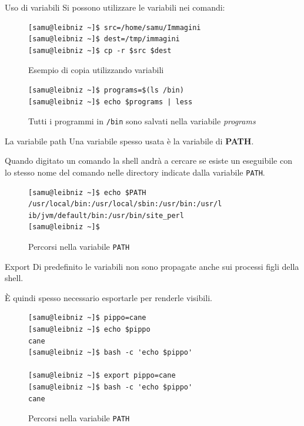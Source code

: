\documentclass{beamer}
\begin{document}
\begin{frame}[fragile]{Uso di variabili}
  Si possono utilizzare le variabili nei comandi:

  \begin{figure}
    \begin{lstlisting}
[samu@leibniz ~]$ src=/home/samu/Immagini
[samu@leibniz ~]$ dest=/tmp/immagini
[samu@leibniz ~]$ cp -r $src $dest
    \end{lstlisting}
    \caption{Esempio di copia utilizzando variabili}
  \end{figure}

  \begin{figure}
    \begin{lstlisting}
[samu@leibniz ~]$ programs=$(ls /bin)
[samu@leibniz ~]$ echo $programs | less
    \end{lstlisting}
    \caption{Tutti i programmi in \texttt{/bin} sono salvati nella variabile 
    \textit{programs}}
  \end{figure}
\end{frame}

\begin{frame}[fragile]{La variabile path}
  Una variabile spesso usata è la variabile di \textbf{PATH}. \medskip

  Quando digitato un comando la shell andrà a cercare se esiste un eseguibile
  con lo stesso nome del comando nelle directory indicate dalla variabile
  \texttt{PATH}. \medskip

  \begin{figure}
    \begin{lstlisting}
[samu@leibniz ~]$ echo $PATH
/usr/local/bin:/usr/local/sbin:/usr/bin:/usr/l
ib/jvm/default/bin:/usr/bin/site_perl
[samu@leibniz ~]$
    \end{lstlisting}
    \caption{Percorsi nella variabile \texttt{PATH}}
  \end{figure}
\end{frame}

\begin{frame}[fragile]{Export}
  Di predefinito le variabili non sono propagate anche sui processi figli della
  shell. \medskip

  È quindi spesso necessario esportarle per renderle visibili. \medskip
  \begin{figure}
    \begin{lstlisting}
[samu@leibniz ~]$ pippo=cane
[samu@leibniz ~]$ echo $pippo
cane
[samu@leibniz ~]$ bash -c 'echo $pippo'

[samu@leibniz ~]$ export pippo=cane
[samu@leibniz ~]$ bash -c 'echo $pippo'
cane
    \end{lstlisting}
    \caption{Percorsi nella variabile \texttt{PATH}}
  \end{figure}
\end{frame}
\end{document}
